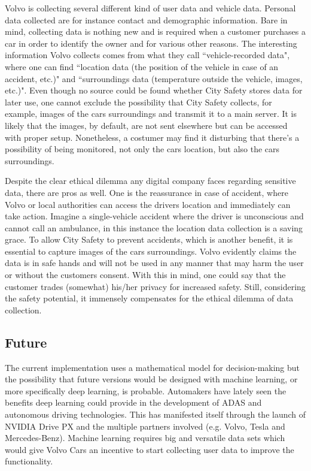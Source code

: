 \documentclass[conference]{IEEEtran}
\begin{document}
Volvo is collecting several different kind of user data and vehicle data. Personal data collected are for instance contact and demographic information. \cite{PrivacyPolicy} Bare in mind, collecting data is nothing new and is required when a customer purchases a car in order to identify the owner and for various other reasons. The interesting information Volvo collects comes from what they call ``vehicle-recorded data", where one can find ``location data (the position of the vehicle in case of an accident, etc.)" and ``surroundings data (temperature outside the vehicle, images, etc.)". \cite{PrivacyPolicy} Even though no source could be found whether City Safety stores data for later use, one cannot exclude the possibility that City Safety collects, for example, images of the cars surroundings and transmit it to a main server. It is likely that the images, by default, are not sent elsewhere but can be accessed with proper setup. Nonetheless, a costumer may find it disturbing that there's a possibility of being monitored, not only the cars location, but also the cars surroundings.

Despite the clear ethical dilemma any digital company faces regarding sensitive data, there are pros as well. One is the reassurance in case of accident, where Volvo or local authorities can access the drivers location and immediately can take action. Imagine a single-vehicle accident where the driver is unconscious and cannot call an ambulance, in this instance the location data collection is a saving grace. To allow City Safety to prevent accidents, which is another benefit, it is essential to capture images of the cars surroundings. Volvo evidently claims the data is in safe hands and will not be used in any manner that may harm the user or without the customers consent. \cite{PrivacyPolicy} With this in mind, one could say that the customer trades (somewhat) his/her privacy for increased safety. Still, considering the safety potential, it immensely compensates for the ethical dilemma of data collection.

\subsection{Future}
The current implementation uses a mathematical model for decision-making but the possibility that future versions would be designed with machine learning, or more specifically deep learning, is probable. \cite{SysDescription} Automakers have lately seen the benefits deep learning could provide in the development of ADAS and autonomous driving technologies. This has manifested itself through the launch of NVIDIA Drive PX and the multiple partners involved (e.g. Volvo, Tesla and Mercedes-Benz). \cite{DrivePX} Machine learning requires big and versatile data sets which would give Volvo Cars an incentive to start collecting user data to improve the functionality.
\end{document}
